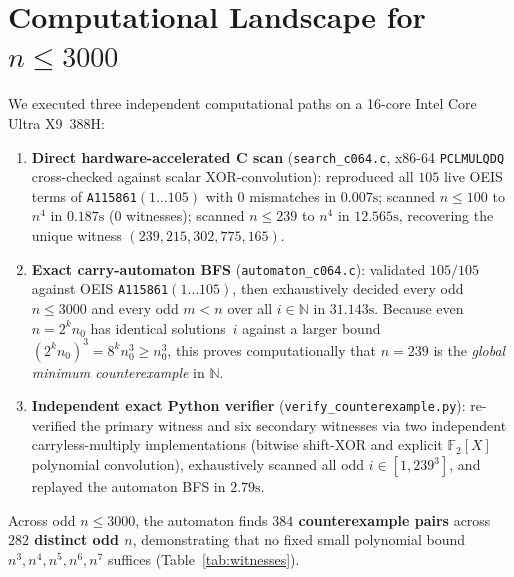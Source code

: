 \documentclass[11pt]{article}
\theoremstyle{definition}
\newcommand{\N}{\mathbb{N}}
\newcommand{\F}{\mathbb{F}}
\newcommand{\seq}[1]{\texttt{#1}}
\begin{document}
\section{Computational Landscape for $n \le 3000$}

We executed three independent computational paths on a 16-core Intel Core Ultra X9~388H:
\begin{enumerate}
\item \textbf{Direct hardware-accelerated C scan} (\texttt{search\_c064.c}, x86-64 \texttt{PCLMULQDQ} cross-checked against scalar XOR-convolution): reproduced all $105$ live OEIS terms of \seq{A115861}$(1 \dots 105)$ with $0$ mismatches in $0.007\text{s}$; scanned $n \le 100$ to $n^4$ in $0.187\text{s}$ ($0$ witnesses); scanned $n \le 239$ to $n^4$ in $12.565\text{s}$, recovering the unique witness $(239, 215, 302{,}775{,}165)$.
\item \textbf{Exact carry-automaton BFS} (\texttt{automaton\_c064.c}): validated $105/105$ against OEIS \seq{A115861}$(1 \dots 105)$, then exhaustively decided every odd $n \le 3000$ and every odd $m < n$ over all $i \in \N$ in $31.143\text{s}$. Because even $n = 2^k n_0$ has identical solutions~$i$ against a larger bound $(2^k n_0)^3 = 8^k n_0^3 \ge n_0^3$, this proves computationally that $n = 239$ is the \emph{global minimum counterexample} in $\N$.
\item \textbf{Independent exact Python verifier} (\texttt{verify\_counterexample.py}): re-verified the primary witness and six secondary witnesses via two independent carryless-multiply implementations (bitwise shift-XOR and explicit $\F_2[X]$ polynomial convolution), exhaustively scanned all odd $i \in [1, 239^3]$, and replayed the automaton BFS in $2.79\text{s}$.
\end{enumerate}

Across odd $n \le 3000$, the automaton finds \textbf{$384$ counterexample pairs} across \textbf{$282$ distinct odd $n$}, demonstrating that no fixed small polynomial bound $n^3, n^4, n^5, n^6, n^7$ suffices (Table~\ref{tab:witnesses}).
\end{document}
